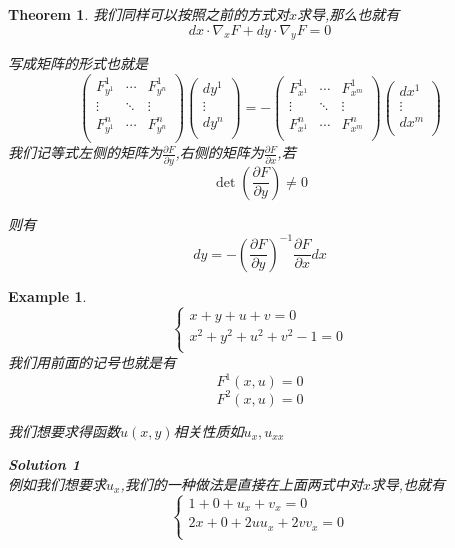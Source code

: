 \documentclass[11pt,hyperref,a4paper,UTF8]{ctexart}
\newtheorem{theorem}{Theorem}[subsection]
\newtheorem{example}{Example}[subsection]
\newcommand{\parameter}[1]{\left(#1\right)}
\begin{document}
\begin{CJK}{UTF8}{gkai}
\begin{theorem}
我们同样可以按照之前的方式对$x$求导,那么也就有
\[dx \cdot \nabla_x F + dy \cdot \nabla_y F = 0\]

写成矩阵的形式也就是
\[\begin{pmatrix}
  F^1_{y^1}&\cdots&F^1_{y^n}\\
  \vdots&\ddots&\vdots\\
  F^n_{y^1}&\cdots&F^n_{y^n}\\
\end{pmatrix}
\begin{pmatrix}
  dy^1\\
  \vdots\\
  dy^n\\
\end{pmatrix}
= - 
\begin{pmatrix}
  F^1_{x^1}&\cdots&F^1_{x^m}\\
  \vdots&\ddots&\vdots\\
  F^n_{x^1}&\cdots&F^n_{x^m}\\
\end{pmatrix}
\begin{pmatrix}
  dx^1\\
  \vdots\\
  dx^m\\
\end{pmatrix}
\]
我们记等式左侧的矩阵为$\frac{\partial F}{\partial y}$,右侧的矩阵为$\frac{\partial F}{\partial x}$,若
\[\det \parameter{\frac{\partial F}{\partial y}} \neq 0\]

则有
\[dy = - \parameter{\frac{\partial F}{\partial y}}^{-1} \frac{\partial F}{\partial x} dx\]
  
\end{theorem}
\begin{example}
  \[\begin{cases}
    x + y + u + v = 0\\
    x^2 + y^2 + u^2 + v^2 - 1 = 0\\
  \end{cases}\]
  我们用前面的记号也就是有
  \[F^1(x,u) = 0\]
  \[F^2(x,u) = 0\]

  我们想要求得函数$u(x,y)$相关性质如$u_x,u_{xx}$

  \textbf{Solution 1}\\

  例如我们想要求$u_x$,我们的一种做法是直接在上面两式中对$x$求导,也就有
  \[\begin{cases}
    1 + 0 + u_x + v_x = 0\\
    2x + 0 + 2u u_x + 2 v v_x = 0\\
  \end{cases}\]


\end{example}
\end{CJK}
\end{document}
